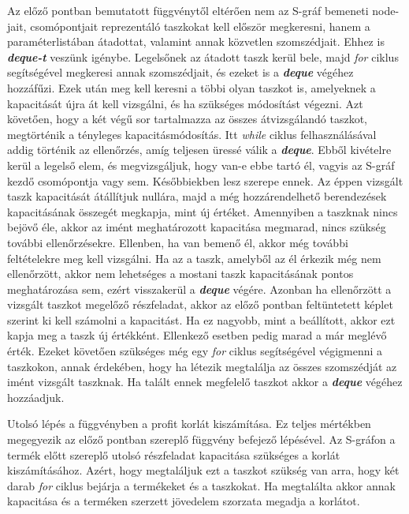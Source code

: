 Az előző pontban bemutatott függvénytől eltérően nem az S-gráf bemeneti node-jait, csomópontjait reprezentáló taszkokat kell először megkeresni, hanem a paraméterlistában átadottat, valamint annak közvetlen szomszédjait.
Ehhez is \textbf{\textit{deque-t}} veszünk igénybe.
Legelsőnek az átadott taszk kerül bele, majd \textit{for} ciklus segítségével megkeresi annak szomszédjait, és ezeket is a \textbf{\textit{deque}} végéhez hozzáfűzi.
Ezek után meg kell keresni a többi olyan taszkot is, amelyeknek a kapacitását újra át kell vizsgálni, és ha szükséges módosítást végezni.
Azt követően, hogy a két végű sor tartalmazza az összes átvizsgálandó taszkot, megtörténik a tényleges kapacitásmódosítás.
Itt \textit{while} ciklus felhasználásával addig történik az ellenőrzés, amíg teljesen üressé válik a \textbf{\textit{deque}}.
Ebből kivételre kerül a legelső elem, és megvizsgáljuk, hogy van-e ebbe tartó él, vagyis az S-gráf kezdő csomópontja vagy sem.
Későbbiekben lesz szerepe ennek.
Az éppen vizsgált taszk kapacitását átállítjuk nullára, majd a még hozzárendelhető berendezések kapacitásának összegét megkapja, mint új értéket.
Amennyiben a taszknak nincs bejövő éle, akkor az imént meghatározott kapacitása megmarad, nincs szükség további ellenőrzésekre.
Ellenben, ha van bemenő él, akkor még további feltételekre meg kell vizsgálni.
Ha az a taszk, amelyből az él érkezik még nem ellenőrzött, akkor nem lehetséges a mostani taszk kapacitásának pontos meghatározása sem, ezért visszakerül a \textbf{\textit{deque}} végére.
Azonban ha ellenőrzött a vizsgált taszkot megelőző részfeladat, akkor az előző pontban feltüntetett képlet szerint ki kell számolni a kapacitást.
Ha ez nagyobb, mint a beállított, akkor ezt kapja meg a taszk új értékként.
Ellenkező esetben pedig marad a már meglévő érték.
Ezeket követően szükséges még egy \textit{for} ciklus segítségével végigmenni a taszkokon, annak érdekében, hogy ha létezik megtalálja az összes szomszédját az imént vizsgált taszknak.
Ha talált ennek megfelelő taszkot akkor a \textbf{\textit{deque}} végéhez hozzáadjuk.

Utolsó lépés a függvényben a profit korlát kiszámítása.
Ez teljes mértékben megegyezik az előző pontban szereplő függvény befejező lépésével.
Az S-gráfon a termék előtt szereplő utolsó részfeladat kapacitása szükséges a korlát kiszámításához.
Azért, hogy megtaláljuk ezt a taszkot szükség van arra, hogy két darab \textit{for} ciklus bejárja a termékeket és a taszkokat.
Ha megtalálta akkor annak kapacitása és a terméken szerzett jövedelem szorzata megadja a korlátot.

